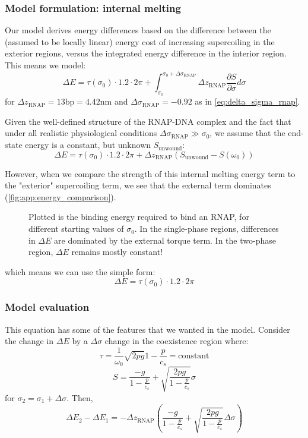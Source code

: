 \documentclass[11pt]{article}
\begin{document}
\subsubsection{Model formulation: internal melting}
Our model derives energy differences based on the difference between the (assumed to be locally linear) energy cost of increasing supercoiling in the exterior regions,
versus the integrated energy difference in the interior region. This means we model:
\[\Delta E = \tau(\sigma_0) \cdot 1.2 \cdot 2\pi + \int_{\sigma_0}^{\sigma_0 + \Delta \sigma_\text{RNAP}} \Delta z_\text{RNAP} \frac{\partial S}{\partial \sigma} d\sigma\]
for \(\Delta z_\text{RNAP} = 13 \text{bp} = 4.42 \text{nm}\) and \(\Delta \sigma_\text{RNAP} = -0.92\) as in \autoref{eq:delta_sigma_rnap}.

Given the well-defined structure of the RNAP-DNA complex and the fact that under all realistic physiological conditions \(\Delta \sigma_\text{RNAP} \gg \sigma_0\), we assume that the end-state energy is a constant, but unknown \(S_\text{unwound}\):
\begin{equation}
    \Delta E = \tau(\sigma_0) \cdot 1.2 \cdot 2\pi + \Delta z_\text{RNAP} \left(S_\text{unwound} - S(\omega_0)\right)
\end{equation}


However, when we compare the strength of this internal melting energy term to the "exterior" supercoiling term, we see that the external term dominates (\autoref{fig:app:energy_comparison}).
\begin{figure}[h]
    \centering
    \caption{Plotted is the binding energy required to bind an RNAP, for different starting values of \(\sigma_0\). In the single-phase regions, differences in \(\Delta E\) are dominated by the external torque term. In the two-phase region, \(\Delta E\) remains mostly constant!}
    \label{fig:app:energy_comparison}
\end{figure}
which means we can use the simple form:
\begin{equation}
    \Delta E = \tau(\sigma_0) \cdot 1.2 \cdot 2\pi
\end{equation}


\FloatBarrier
\subsubsection{Model evaluation}
This equation has some of the features that we wanted in the model. Consider the change in \(\Delta E\) by a \(\Delta \sigma\) change in the coexistence region where:
\[\tau = \frac{1}{\omega_0} \sqrt{2pg}{1 - \frac{p}{c_s}} = \text{constant}\]
\[S = \frac{-g}{1 - \frac{p}{c_s}} + \sqrt{\frac{2pg}{1 - \frac{p}{c_s}}} \sigma\]
for \(\sigma_2 = \sigma_1 + \Delta \sigma\). Then,
\[\Delta E_2 - \Delta E_1 = - \Delta z_\text{RNAP} \left( \frac{-g}{1 - \frac{p}{c_s}} + \sqrt{\frac{2pg}{1-\frac{p}{c_s}}} \Delta \sigma\right)\]
\end{document}

